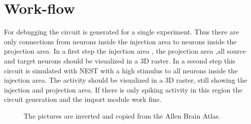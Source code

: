 \documentclass[a4paper]{IEEEtran}
\begin{document}
   \section{Work-flow}
   For debugging the circuit is generated for a single experiment. Thus there are only connections
   from neurons inside the injection area to neurons inside the projection area. In a first step the injection area , the projection area ,all source and target neurons should be visualized in a 3D raster. In a second step this circuit is simulated with NEST with a high stimulus to all neurons inside the injection area. The activity should be visualized in a 3D raster, still showing the injection and projection area. If there is only spiking activity in this region the circuit generation and the import module work fine.
   
   \begin{figure}[ht!]
   	\begin{center}
        \hspace{1cm}
    	   \end{center}
    	\caption{%
        The pictures are inverted and copied from the Allen Brain Atlas.
     }%
   \label{fig:atlas}
   \end{figure}
   
\end{document}
